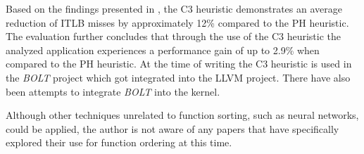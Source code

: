 Based on the findings presented in \cite{hfsort}, the C3 heuristic demonstrates an average reduction of ITLB misses by approximately 12\% compared to the PH heuristic. The evaluation further concludes that through the use of the C3 heuristic the analyzed application experiences a performance gain of up to 2.9\% when compared to the PH heuristic. At the time of writing the C3 heuristic is used in the \textit{BOLT} project \cite{bolt} which got integrated into the LLVM project. \cite{bolt-in-llvm} There have also been attempts to integrate \textit{BOLT} into the kernel. \cite{bolt-kernel} 

\enlargethispage{2\baselineskip}
Although other techniques unrelated to function sorting, such as neural networks, could be applied, the author is not aware of any papers that have specifically explored their use for function ordering at this time.